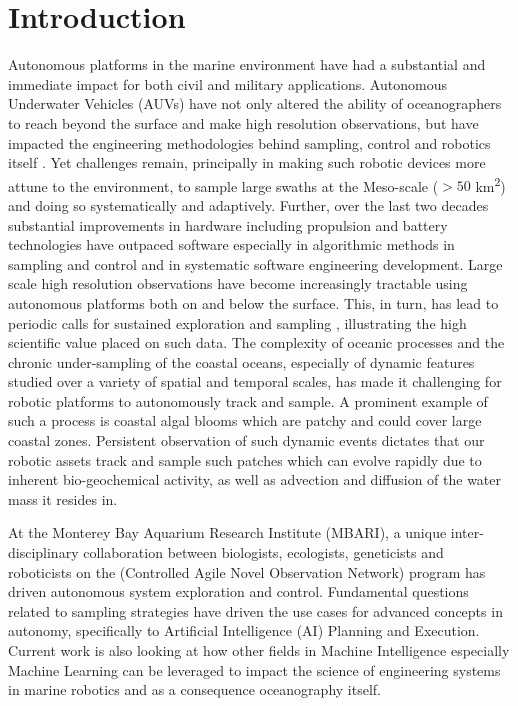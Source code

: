 \section{Introduction}
\label{sec:intro}


Autonomous platforms in the marine environment have had a substantial
and immediate impact for both civil and military
applications. Autonomous Underwater Vehicles (AUVs) have not only
altered the ability of oceanographers to reach beyond the surface and
make high resolution observations, but have impacted the engineering
methodologies behind sampling, control and robotics itself
\cite{Brierley08032002,ryan05,Thomas06,Yoerger01012007,Incze2009,Rigby10}. Yet
challenges remain, principally in making such robotic devices more
attune to the environment, to sample large swaths at the Meso-scale
($> 50$ km\textsuperscript{2}) and doing so systematically and
adaptively. Further, over the last two decades substantial
improvements in hardware including propulsion and battery technologies
have outpaced software especially in algorithmic methods in sampling
and control and in systematic software engineering development. Large
scale high resolution observations have become increasingly tractable
using autonomous platforms both on and below the surface.  This, in
turn, has lead to periodic calls for sustained exploration and
sampling \cite{rudnick03}, illustrating the high scientific value
placed on such data.  The complexity of oceanic processes and the
chronic under-sampling of the coastal oceans, especially of dynamic
features studied over a variety of spatial and temporal scales, has
made it challenging for robotic platforms to autonomously track and
sample. A prominent example of such a process is coastal algal blooms
which are patchy and could cover large coastal zones. Persistent
observation of such dynamic events dictates that our robotic assets
track and sample such patches which can evolve rapidly due to inherent
bio-geochemical activity, as well as advection and diffusion of the
water mass it resides in.

At the Monterey Bay Aquarium Research Institute (MBARI), a unique
inter-disciplinary collaboration between biologists, ecologists,
geneticists and roboticists on the \can (Controlled Agile Novel
Observation Network) program \cite{canon} has driven autonomous system
exploration and control. Fundamental questions related to sampling
strategies have driven the use cases for advanced concepts in
autonomy, specifically to Artificial Intelligence (AI) Planning and
Execution. Current work is also looking at how other fields in Machine
Intelligence especially Machine Learning can be leveraged to impact
the science of engineering systems in marine robotics and as a
consequence oceanography itself.

